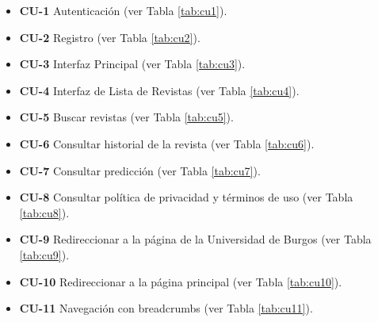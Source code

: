 \begin{itemize}
\item \textbf{CU-1} Autenticación (ver Tabla \ref{tab:cu1}).
\item \textbf{CU-2} Registro (ver Tabla \ref{tab:cu2}).
\item \textbf{CU-3} Interfaz Principal (ver Tabla \ref{tab:cu3}).
\item \textbf{CU-4} Interfaz de Lista de Revistas (ver Tabla \ref{tab:cu4}).
\item \textbf{CU-5} Buscar revistas (ver Tabla \ref{tab:cu5}).
\item \textbf{CU-6} Consultar historial de la revista (ver Tabla \ref{tab:cu6}).
\item \textbf{CU-7} Consultar predicción (ver Tabla \ref{tab:cu7}).
\item \textbf{CU-8} Consultar política de privacidad y términos de uso (ver Tabla \ref{tab:cu8}).
\item \textbf{CU-9} Redireccionar a la página de la Universidad de Burgos (ver Tabla \ref{tab:cu9}).
\item \textbf{CU-10} Redireccionar a la página principal (ver Tabla \ref{tab:cu10}).
\item \textbf{CU-11} Navegación con breadcrumbs (ver Tabla \ref{tab:cu11}).
\end{itemize}

